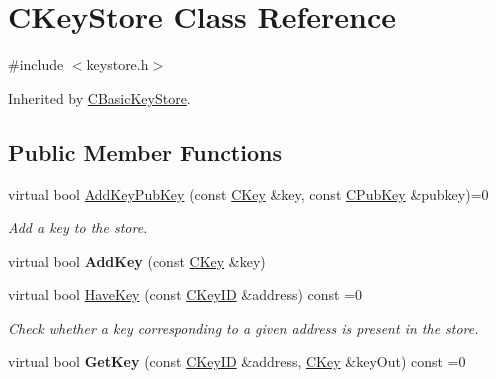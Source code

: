 \hypertarget{class_c_key_store}{}\section{C\+Key\+Store Class Reference}
\label{class_c_key_store}


{\ttfamily \#include $<$keystore.\+h$>$}



Inherited by \mbox{\hyperlink{class_c_basic_key_store}{C\+Basic\+Key\+Store}}.

\subsection*{Public Member Functions}
\begin{DoxyCompactItemize}
\item 
\mbox{\label{class_c_key_store_a1956e4f5860ded321d6f697047d8236a}} 
virtual bool \mbox{\hyperlink{class_c_key_store_a1956e4f5860ded321d6f697047d8236a}{Add\+Key\+Pub\+Key}} (const \mbox{\hyperlink{class_c_key}{C\+Key}} \&key, const \mbox{\hyperlink{class_c_pub_key}{C\+Pub\+Key}} \&pubkey)=0
\begin{DoxyCompactList}\small\item\em Add a key to the store. \end{DoxyCompactList}\item 
\mbox{\label{class_c_key_store_a0b4ca43724cfcc6e2ea70c0baa192750}} 
virtual bool {\bfseries Add\+Key} (const \mbox{\hyperlink{class_c_key}{C\+Key}} \&key)
\item 
\mbox{\label{class_c_key_store_a9398451d4270fae27b29f686a9d43a65}} 
virtual bool \mbox{\hyperlink{class_c_key_store_a9398451d4270fae27b29f686a9d43a65}{Have\+Key}} (const \mbox{\hyperlink{class_c_key_i_d}{C\+Key\+ID}} \&address) const =0
\begin{DoxyCompactList}\small\item\em Check whether a key corresponding to a given address is present in the store. \end{DoxyCompactList}\item 
\mbox{\label{class_c_key_store_a2dffca468fef2e5da2e42a7c983d968a}} 
virtual bool {\bfseries Get\+Key} (const \mbox{\hyperlink{class_c_key_i_d}{C\+Key\+ID}} \&address, \mbox{\hyperlink{class_c_key}{C\+Key}} \&key\+Out) const =0

\end{DoxyCompactItemize}
